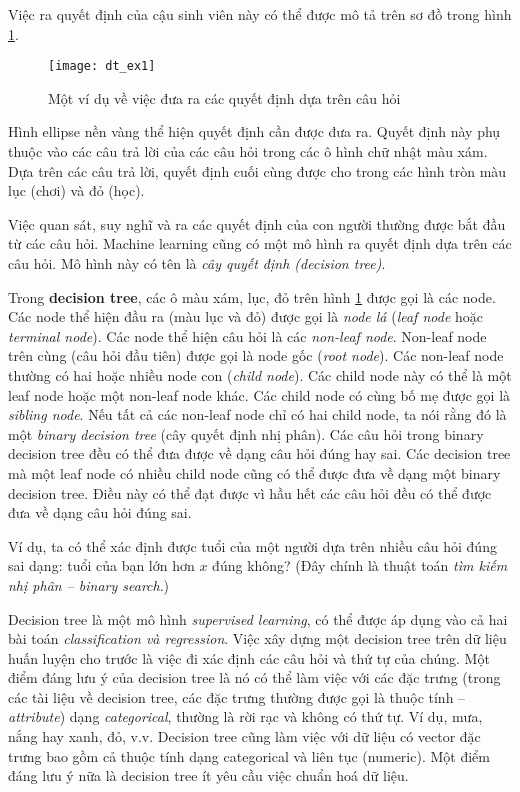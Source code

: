 \documentclass[../main-report.tex]{subfiles}
\begin{document}
Việc ra quyết định của cậu sinh viên này có thể được mô tả trên sơ đồ trong hình \ref{fig:dt_ex1}.

\begin{figure}[ht!]
\centering\texttt{[image: dt\_ex1]}
\caption{Một ví dụ về việc đưa ra các quyết định dựa trên câu hỏi}
\label{fig:dt_ex1}
\end{figure}

Hình ellipse nền vàng thể hiện quyết định cần được đưa ra. Quyết định này phụ thuộc vào các câu trả lời của các câu hỏi trong các ô hình chữ nhật màu xám. Dựa trên các câu trả lời, quyết định cuối cùng được cho trong các hình tròn màu lục (chơi) và đỏ (học).

Việc quan sát, suy nghĩ và ra các quyết định của con người thường được bắt đầu từ các câu hỏi. Machine learning cũng có một mô hình ra quyết định dựa trên các câu hỏi. Mô hình này có tên là \textit{cây quyết định (decision tree)}.

Trong \textbf{decision tree}, các ô màu xám, lục, đỏ trên hình \ref{fig:dt_ex1} được gọi là các node. Các node thể hiện đầu ra (màu lục và đỏ) được gọi là \textit{node lá} (\textit{leaf node} hoặc \textit{terminal node}). Các node thể hiện câu hỏi là các \textit{non-leaf node}. Non-leaf node trên cùng (câu hỏi đầu tiên) được gọi là node gốc (\textit{root node}). Các non-leaf node thường có hai hoặc nhiều node con (\textit{child node}). Các child node này có thể là một leaf node hoặc một non-leaf node khác. Các child node có cùng bố mẹ được gọi là \textit{sibling node}. Nếu tất cả các non-leaf node chỉ có hai child node, ta nói rằng đó là một \textit{binary decision tree} (cây quyết định nhị phân). Các câu hỏi trong binary decision tree đều có thể đưa được về dạng câu hỏi đúng hay sai. Các decision tree mà một leaf node có nhiều child node cũng có thể được đưa về dạng một binary decision tree. Điều này có thể đạt được vì hầu hết các câu hỏi đều có thể được đưa về dạng câu hỏi đúng sai.

Ví dụ, ta có thể xác định được tuổi của một người dựa trên nhiều câu hỏi đúng sai dạng: tuổi của bạn lớn hơn $x$ đúng không? (Đây chính là thuật toán \textit{tìm kiếm nhị phân – binary search}.)

Decision tree là một mô hình \textit{supervised learning}, có thể được áp dụng vào cả hai bài toán \textit{classification và regression}. Việc xây dựng một decision tree trên dữ liệu huấn luyện cho trước là việc đi xác định các câu hỏi và thứ tự của chúng. Một điểm đáng lưu ý của decision tree là nó có thể làm việc với các đặc trưng (trong các tài liệu về decision tree, các đặc trưng thường được gọi là thuộc tính – \textit{attribute}) dạng \textit{categorical}, thường là rời rạc và không có thứ tự. Ví dụ, mưa, nắng hay xanh, đỏ, v.v. Decision tree cũng làm việc với dữ liệu có vector đặc trưng bao gồm cả thuộc tính dạng categorical và liên tục (numeric). Một điểm đáng lưu ý nữa là decision tree ít yêu cầu việc chuẩn hoá dữ liệu.
\end{document}

